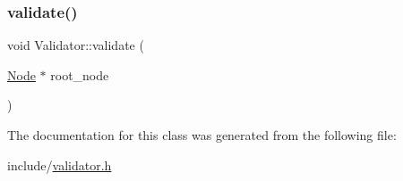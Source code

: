 \mbox{\label{classValidator_aa0bc30458ce0255fcec64d8346e384a5}} 
\subsubsection{\texorpdfstring{validate()}{validate()}}
{\footnotesize\ttfamily void Validator\+::validate (\begin{DoxyParamCaption}\item[{\hyperlink{classNode}{Node} $\ast$}]{root\+\_\+node }\end{DoxyParamCaption})}



The documentation for this class was generated from the following file\+:\begin{DoxyCompactItemize}
\item 
include/\hyperlink{validator_8h}{validator.\+h}\end{DoxyCompactItemize}

